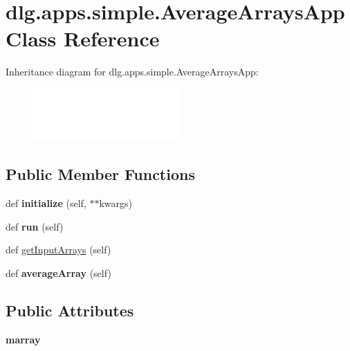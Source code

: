 \hypertarget{classdlg_1_1apps_1_1simple_1_1_average_arrays_app}{}\section{dlg.\+apps.\+simple.\+Average\+Arrays\+App Class Reference}
\label{classdlg_1_1apps_1_1simple_1_1_average_arrays_app}
Inheritance diagram for dlg.\+apps.\+simple.\+Average\+Arrays\+App\+:\begin{figure}[H]
\begin{center}
\leavevmode
\includegraphics[height=2.000000cm]{classdlg_1_1apps_1_1simple_1_1_average_arrays_app}
\end{center}
\end{figure}
\subsection*{Public Member Functions}
\begin{DoxyCompactItemize}
\item 
\mbox{\label{classdlg_1_1apps_1_1simple_1_1_average_arrays_app_a5b8f261f24f56d4d989ac5b0fa4adbd4}} 
def {\bfseries initialize} (self, $\ast$$\ast$kwargs)
\item 
\mbox{\label{classdlg_1_1apps_1_1simple_1_1_average_arrays_app_a6b1d02edeb152ef36114e60fd514d510}} 
def {\bfseries run} (self)
\item 
def \mbox{\hyperlink{classdlg_1_1apps_1_1simple_1_1_average_arrays_app_ae0c6c4db425f36093fc053ed75a9db16}{get\+Input\+Arrays}} (self)
\item 
\mbox{\label{classdlg_1_1apps_1_1simple_1_1_average_arrays_app_aa5f829dadfeddea6d4f6a723466e2dc2}} 
def {\bfseries average\+Array} (self)
\end{DoxyCompactItemize}
\subsection*{Public Attributes}
\begin{DoxyCompactItemize}
\item 
\mbox{\label{classdlg_1_1apps_1_1simple_1_1_average_arrays_app_ab5b2429f5da91e32d9dd5e7b14abc6e3}} 
{\bfseries marray}
\end{DoxyCompactItemize}
